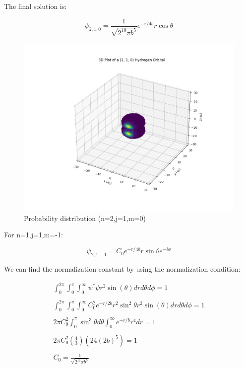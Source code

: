 The final solution is:

\begin{equation}
  \psi_{2,1,0} = \frac{1}{\sqrt{2^{10}\pi b^5}} e^{-r/4b} r \cos\theta
\end{equation}


\begin{figure}
  \centering
  \includegraphics{images9/3d_plot_2,1,0.png}
  \caption{Probability distribution (n=2,j=1,m=0)}
\end{figure}

For n=1,j=1,m=-1:

\begin{equation}
  \psi_{2,1,-1} = C_0 e^{-r/4b} r \sin\theta e^{-i\phi}
\end{equation}

We can find the normalization constant by using the normalization condition:

\begin{equation}
\begin{array}{c}
  \int_{0}^{2\pi}\int_{0}^{\pi}\int_{0}^{\infty} \psi^*\psi r^2 \sin(\theta) dr d\theta d\phi = 1
  \\

  \\
  \int_{0}^{2\pi}\int_{0}^{\pi}\int_{0}^{\infty} C_0^2 e^{-r/2b} r^2 \sin^2\theta r^2 \sin(\theta) dr d\theta d\phi = 1
  \\

  \\
  2 \pi C_0^2\int_{0}^{\pi}\sin^3\theta d\theta \int_{0}^{\infty} e^{-r/b} r^4 dr = 1
  \\

  \\
  2 \pi C_0^2 (\frac{4}{3}) (24(2b)^5) = 1
  \\

  \\
  C_0 = \frac{1}{\sqrt{2^{11}\pi b^5}}
\end{array}
\end{equation}

